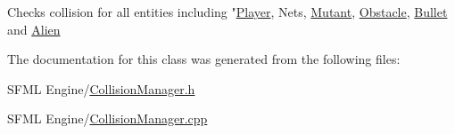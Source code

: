Checks collision for all entities including "\hyperlink{class_player}{Player}, Nets, \hyperlink{class_mutant}{Mutant}, \hyperlink{class_obstacle}{Obstacle}, \hyperlink{class_bullet}{Bullet} and \hyperlink{class_alien}{Alien} 

The documentation for this class was generated from the following files\+:\begin{DoxyCompactItemize}
\item 
S\+F\+M\+L Engine/\hyperlink{_collision_manager_8h}{Collision\+Manager.\+h}\item 
S\+F\+M\+L Engine/\hyperlink{_collision_manager_8cpp}{Collision\+Manager.\+cpp}\end{DoxyCompactItemize}
